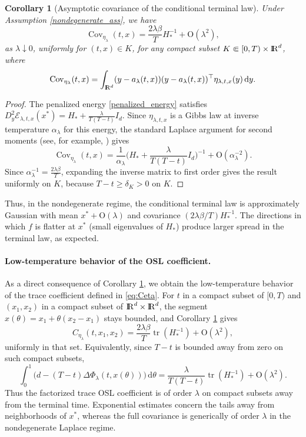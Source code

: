 \documentclass[11pt]{amsart}
\def\R{\mathrm{I\kern-0.21emR}}
\newcommand{\dd}{\,\mathrm{d}}
\newcommand{\Cov}{\operatorname{Cov}_{\eta_\lambda}}
\newcommand{\Covtx}{\Cov(t,x)}  %
\renewcommand{\geq}{\geqslant}
\numberwithin{equation}{section}
\numberwithin{figure}{section}
\newtheorem{corollary}[theorem]{Corollary}%
\theoremstyle{definition}\newtheorem{remark}[theorem]{Remark}%
\begin{document}
\begin{corollary}[Asymptotic covariance of the conditional terminal law]\label{laplace_covariance}
Under Assumption \ref{nondegenerate_ass}, we have
$$
\Covtx
= \frac{2\lambda\beta}{T}H_*^{-1} + \mathrm{O}(\lambda^2),
$$
as $\lambda \downarrow 0$, uniformly for $(t,x) \in K$, for any compact subset $K \Subset [0,T) \times \R^d$, where 
\begin{equation}\label{eq:covariance}
\Covtx = \int_{\R^d} (y - a_\lambda(t,x))(y - a_\lambda(t,x))^\top \eta_{\lambda,t,x}(y)\dd y.
\end{equation}
\end{corollary}

\begin{proof}
The penalized energy \eqref{penalized_energy} satisfies $\displaystyle D_y^2 \mathcal E_{\lambda,t,x}(x^*) = H_* + \frac{\lambda}{T(T-t)}I_d$. Since $\eta_{\lambda,t,x}$ is a Gibbs law at inverse temperature $\alpha_\lambda$ for this energy, the standard Laplace argument for second moments (see, for example, \cite[Chapter~4]{deBruijn81}) gives
$$
\Covtx
=
\frac{1}{\alpha_\lambda}\bigg( H_* + \frac{\lambda}{T(T-t)}I_d \bigg)^{-1} + \mathrm{O}(\alpha_\lambda^{-2}).
$$
Since $\displaystyle \alpha_\lambda^{-1} = \frac{2\lambda\beta}{T}$, expanding the inverse matrix to first order gives the result uniformly on $K$, because $T-t \geq \delta_K > 0$ on $K$.
\end{proof}

Thus, in the nondegenerate regime, the conditional terminal law is approximately Gaussian with mean $x^* + \mathrm{O}(\lambda)$ and covariance $(2\lambda\beta/T)H_*^{-1}$. The directions in which $f$ is flatter at $x^*$ (small eigenvalues of $H_*$) produce larger spread in the terminal law, as expected.

\medskip



\paragraph{\bf Low-temperature behavior of the OSL coefficient.}
As a direct consequence of Corollary \ref{laplace_covariance}, we obtain the low-temperature behavior of the trace coefficient defined in \eqref{eq:Ceta}. For $t$ in a compact subset of $[0,T)$ and $(x_1,x_2)$ in a compact subset of $\R^d\times\R^d$, the segment $x(\theta)=x_1+\theta(x_2-x_1)$ stays bounded, and Corollary \ref{laplace_covariance} gives
\begin{equation}\label{Ceta_laplace}
C_{\eta_\lambda}(t,x_1,x_2)
=\frac{2\lambda\beta}{T}\operatorname{tr}(H_*^{-1})+\mathrm{O}(\lambda^2),
\end{equation}
uniformly in that set. Equivalently, since $T-t$ is bounded away from zero on such compact subsets,
$$
\int_0^1\big(d-(T-t)\Delta\Phi_\lambda(t,x(\theta))\big)\dd\theta
=
\frac{\lambda}{T(T-t)}\operatorname{tr}(H_*^{-1})+\mathrm{O}(\lambda^2).
$$
Thus the factorized trace OSL coefficient is of order $\lambda$ on compact subsets away from the terminal time. Exponential estimates concern the tails away from neighborhoods of $x^*$, whereas the full covariance is generically of order $\lambda$ in the nondegenerate Laplace regime.
\end{document}
